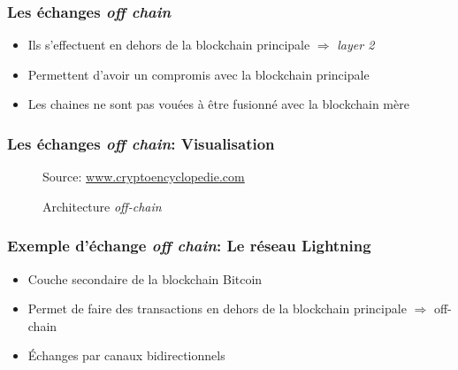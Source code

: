 \begin{frame}
	\frametitle{Les échanges \textit{off chain}}
	\begin{itemize}
		\item Ils s'effectuent en dehors de la blockchain principale $\Rightarrow$ \textit{layer 2}
		\item Permettent d'avoir un compromis avec la blockchain principale
		\item Les chaines ne sont pas vouées à être fusionné avec la blockchain mère
	\end{itemize}
\end{frame}

\begin{frame}
	\frametitle{Les échanges \textit{off chain}: Visualisation}
	\begin{figure}[h!]
		\centering
		{\scriptsize Source: \url{www.cryptoencyclopedie.com}}
		\caption{Architecture \textit{off-chain}}
		\label{fig:offchain}
	\end{figure}
\end{frame}


\begin{frame}
	\frametitle{Exemple d'échange \textit{off chain}: Le réseau Lightning}
	\begin{itemize}
		\item Couche secondaire de la blockchain Bitcoin \newline
		\item Permet de faire des transactions en dehors de la blockchain principale $\Rightarrow$ off-chain \newline
		\item Échanges par canaux bidirectionnels
	\end{itemize}
\end{frame}


